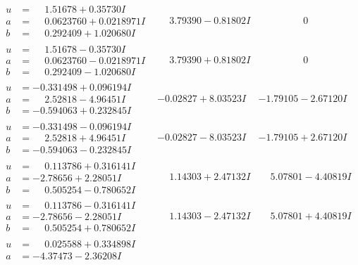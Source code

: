 \documentclass[1p]{elsarticle_modified}
\theoremstyle{definition}
\begin{document}
$$\begin{array}{c|c|c}
 \hline 
\begin{aligned}
u &= \phantom{-}1.51678 + 0.35730 I \\
a &= \phantom{-}0.0623760 + 0.0218971 I \\
b &= \phantom{-}0.292409 + 1.020680 I\end{aligned}
 & \phantom{-}3.79390 - 0.81802 I & \phantom{-0.000000 } 0 \\ \hline\begin{aligned}
u &= \phantom{-}1.51678 - 0.35730 I \\
a &= \phantom{-}0.0623760 - 0.0218971 I \\
b &= \phantom{-}0.292409 - 1.020680 I\end{aligned}
 & \phantom{-}3.79390 + 0.81802 I & \phantom{-0.000000 } 0 \\ \hline\begin{aligned}
u &= -0.331498 + 0.096194 I \\
a &= \phantom{-}2.52818 - 4.96451 I \\
b &= -0.594063 + 0.232845 I\end{aligned}
 & -0.02827 + 8.03523 I & -1.79105 - 2.67120 I \\ \hline\begin{aligned}
u &= -0.331498 - 0.096194 I \\
a &= \phantom{-}2.52818 + 4.96451 I \\
b &= -0.594063 - 0.232845 I\end{aligned}
 & -0.02827 - 8.03523 I & -1.79105 + 2.67120 I \\ \hline\begin{aligned}
u &= \phantom{-}0.113786 + 0.316141 I \\
a &= -2.78656 + 2.28051 I \\
b &= \phantom{-}0.505254 - 0.780652 I\end{aligned}
 & \phantom{-}1.14303 + 2.47132 I & \phantom{-}5.07801 - 4.40819 I \\ \hline\begin{aligned}
u &= \phantom{-}0.113786 - 0.316141 I \\
a &= -2.78656 - 2.28051 I \\
b &= \phantom{-}0.505254 + 0.780652 I\end{aligned}
 & \phantom{-}1.14303 - 2.47132 I & \phantom{-}5.07801 + 4.40819 I \\ \hline\begin{aligned}
u &= \phantom{-}0.025588 + 0.334898 I \\
a &= -4.37473 - 2.36208 I \\

\end{aligned}
\end{array}$$
\end{document}
